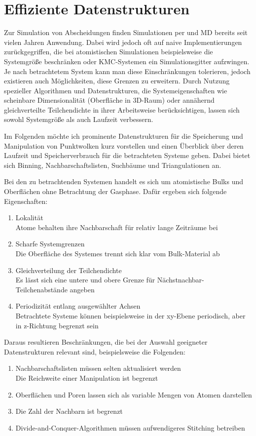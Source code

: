 \section{Effiziente Datenstrukturen}
\label{sec:datastructures}

Zur Simulation von Abscheidungen finden Simulationen per  und MD bereits seit vielen Jahren Anwendung.
Dabei wird jedoch oft auf naive Implementierungen zurückgegriffen, die bei atomistischen Simulationen beispielsweise die Systemgröße beschränken oder KMC-Systemen ein Simulationsgitter aufzwingen.
Je nach betrachtetem System kann man diese Einschränkungen tolerieren, jedoch existieren auch Möglichkeiten, diese Grenzen zu erweitern.
Durch Nutzung spezieller Algorithmen und Datenstrukturen, die Systemeigenschaften wie scheinbare Dimensionalität (Oberfläche in 3D-Raum) oder annähernd gleichverteilte Teilchendichte in ihrer Arbeitsweise berücksichtigen, lassen sich sowohl Systemgröße als auch Laufzeit verbessern.

Im Folgenden möchte ich prominente Datenstrukturen für die Speicherung und Manipulation von Punktwolken kurz vorstellen und einen Überblick über deren Laufzeit und Speicherverbrauch für die betrachteten Systeme geben.
Dabei bietet sich Binning, Nachbarschaftslisten, Suchbäume und Triangulationen an.

Bei den zu betrachtenden Systemen handelt es sich um atomistische Bulks und Oberflächen ohne Betrachtung der Gasphase.
Dafür ergeben sich folgende Eigenschaften:
\begin{enumerate}
\item Lokalität\\
  Atome behalten ihre Nachbarschaft für relativ lange Zeiträume bei
\item Scharfe Systemgrenzen\\
  Die Oberfläche des Systemes trennt sich klar vom Bulk-Material ab
\item Gleichverteilung der Teilchendichte\\
  Es lässt sich eine untere und obere Grenze für Nächstnachbar-Teilchenabstände angeben
\item Periodizität entlang ausgewählter Achsen\\
  Betrachtete Systeme können beispielsweise in der xy-Ebene periodisch, aber in z-Richtung begrenzt sein
\end{enumerate}
Daraus resultieren Beschränkungen, die bei der Auswahl geeigneter Datenstrukturen relevant sind, beispielsweise die Folgenden:
\begin{enumerate}
\item Nachbarschaftslisten müssen selten aktualisiert werden\\
  Die Reichweite einer Manipulation ist begrenzt
\item Oberflächen und Poren lassen sich als variable Mengen von Atomen darstellen
\item Die Zahl der Nachbarn ist begrenzt
\item Divide-and-Conquer-Algorithmen müssen aufwendigeres Stitching betreiben
\end{enumerate}

